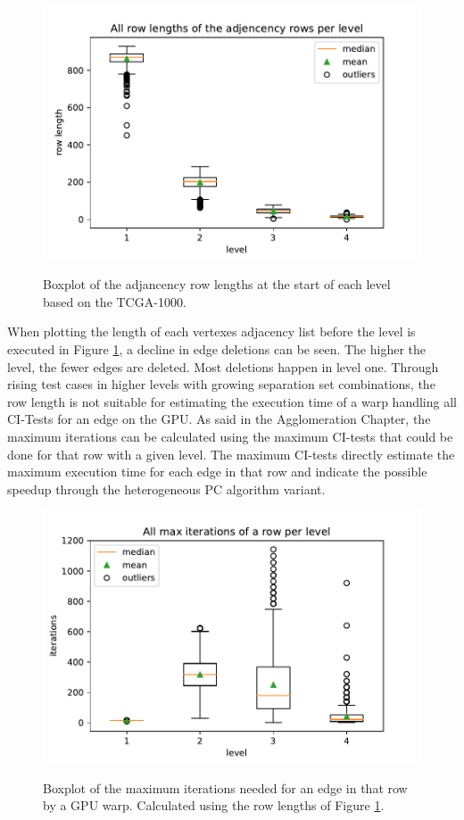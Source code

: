 \begin{figure}[H]
  \caption{Boxplot of the adjancency row lengths at the start of each level based on the TCGA-1000.}
  \includegraphics[width=\textwidth]{figures/rowlength_bxplt.pdf}
  \centering
  \label{fig:rowlength_bxplt}
\end{figure}

When plotting the length of each vertexes adjacency list before the level is executed in Figure \ref{fig:rowlength_bxplt}, a decline in edge deletions can be seen. The higher the level, the fewer edges are deleted. Most deletions happen in level one. Through rising test cases in higher levels with growing separation set combinations, the row length is not suitable for estimating the execution time of a warp handling all CI-Tests for an edge on the GPU. As said in the Agglomeration Chapter, the maximum iterations can be calculated using the maximum CI-tests that could be done for that row with a given level. The maximum CI-tests directly estimate the maximum execution time for each edge in that row and indicate the possible speedup through the heterogeneous PC algorithm variant.

\begin{figure}[H]
  \caption{Boxplot of the maximum iterations needed for an edge in that row by a GPU warp. Calculated using the row lengths of Figure \ref{fig:rowlength_bxplt}.}
  \includegraphics[width=\textwidth]{figures/iterations_bxplt.pdf}
  \centering
  \label{fig:iterations_bxplt}
\end{figure}

